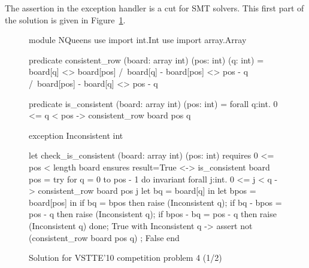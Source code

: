 The assertion in the exception handler is a cut for SMT solvers.
This first part of the solution is given in Figure~\ref{fig:NQueens1}.
\begin{figure}
  \centering
\begin{whycode}
module NQueens
  use import int.Int
  use import array.Array

  predicate consistent_row (board: array int) (pos: int) (q: int) =
    board[q] <> board[pos] /\
    board[q] - board[pos] <> pos - q /\
    board[pos] - board[q] <> pos - q

  predicate is_consistent (board: array int) (pos: int) =
    forall q:int. 0 <= q < pos -> consistent_row board pos q

  exception Inconsistent int

  let check_is_consistent (board: array int) (pos: int)
    requires { 0 <= pos < length board }
    ensures  { result=True <-> is_consistent board pos }
  = try
      for q = 0 to pos - 1 do
        invariant {
          forall j:int. 0 <= j < q -> consistent_row board pos j
        }
        let bq   = board[q]   in
        let bpos = board[pos] in
        if bq        = bpos    then raise (Inconsistent q);
        if bq - bpos = pos - q then raise (Inconsistent q);
        if bpos - bq = pos - q then raise (Inconsistent q)
      done;
      True
    with Inconsistent q ->
      assert { not (consistent_row board pos q) };
      False
    end
\end{whycode}
\vspace*{-1em}%
  \caption{Solution for VSTTE'10 competition problem 4 (1/2)}
  \label{fig:NQueens1}
\end{figure}

